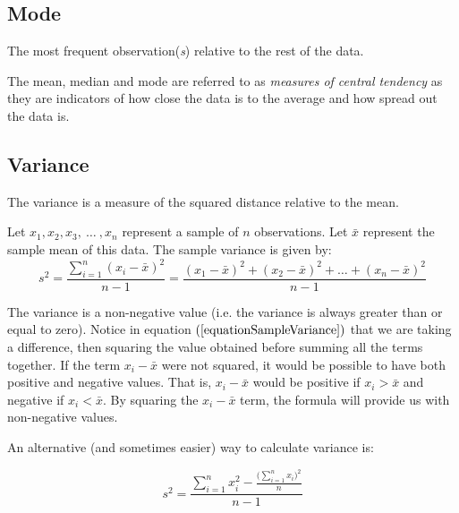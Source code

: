 \subsection{Mode}

\begin{definition}[Mode]	
The most frequent observation(\textit{s}) relative to the rest of the data.
\end{definition}


\begin{nt}
The mean, median and mode are referred to as \textit{measures of central tendency} as they are indicators of how close the data is to the average and how spread out the data is.
\end{nt}




\subsection{Variance}	

The variance is a measure of the squared distance relative to the mean.

\begin{definition}	
Let $x_{1},x_{2},x_{3}, ~\ldots~, x_{n}$ represent a sample of $n$ observations.
Let $\bar{x}$ represent the sample mean of this data.
The sample variance is given by:
	\begin{equation}
	\label{equationSampleVariance}
	s^{2} = \frac{ \displaystyle\sum_{i=1}^{n} (x_{i} - \bar{x})^{2} }{n - 1}  = \frac{ (x_{1} - \bar{x})^{2} +  (x_{2} - \bar{x})^{2} + \ldots + (x_{n} - \bar{x})^{2} }{n-1}
	\end{equation}
\end{definition}


\noindent
The variance is a non-negative value (i.e. the variance is always greater than or equal to zero).
Notice in equation $(\ref{equationSampleVariance})$ that we are taking a difference, then squaring the value obtained %
before
summing all the terms together. 
If the term $x_{i} - \bar{x}$ were not squared, it would be possible to have both positive and negative values. That is, $x_{i}-\bar{x}$ would be positive if $x_{i} > \bar{x}$ and negative if $x_{i} < \bar{x}$. By squaring the $x_{i} - \bar{x}$ term, the formula will provide us with non-negative values.


\begin{nt}
An alternative (and sometimes easier) way to calculate variance is:

\begin{equation}\label{eqnSampleVariance}
	s^{2} =  \frac{ \displaystyle\sum_{i=1}^{n} x_{i}^2 -  \frac{ \bigg( \displaystyle\sum_{i=1}^{n} x_{i} \bigg)^{2} }{n} }{n - 1} %
\end{equation}
\end{nt}



